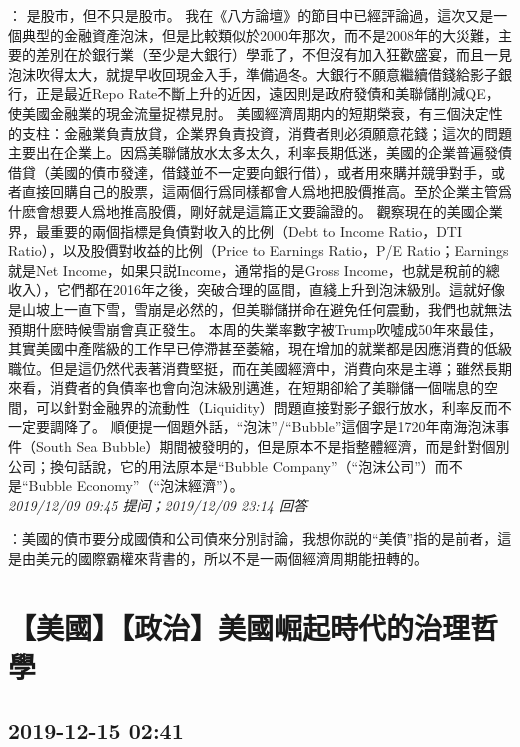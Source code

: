 \documentclass[twocolumn]{ctexart}
\begin{document}
：
是股市，但不只是股市。 
我在《八方論壇》的節目中已經評論過，這次又是一個典型的金融資產泡沫，但是比較類似於2000年那次，而不是2008年的大災難，主要的差別在於銀行業（至少是大銀行）學乖了，不但沒有加入狂歡盛宴，而且一見泡沫吹得太大，就提早收回現金入手，準備過冬。大銀行不願意繼續借錢給影子銀行，正是最近Repo Rate不斷上升的近因，遠因則是政府發債和美聯儲削減QE，使美國金融業的現金流量捉襟見肘。 
美國經濟周期内的短期榮衰，有三個決定性的支柱：金融業負責放貸，企業界負責投資，消費者則必須願意花錢；這次的問題主要出在企業上。因爲美聯儲放水太多太久，利率長期低迷，美國的企業普遍發債借貸（美國的債市發達，借錢並不一定要向銀行借），或者用來購并競爭對手，或者直接回購自己的股票，這兩個行爲同樣都會人爲地把股價推高。至於企業主管爲什麽會想要人爲地推高股價，剛好就是這篇正文要論證的。 
觀察現在的美國企業界，最重要的兩個指標是負債對收入的比例（Debt to Income Ratio，DTI Ratio），以及股價對收益的比例（Price to Earnings Ratio，P/E Ratio；Earnings就是Net Income，如果只説Income，通常指的是Gross Income，也就是稅前的總收入），它們都在2016年之後，突破合理的區間，直綫上升到泡沫級別。這就好像是山坡上一直下雪，雪崩是必然的，但美聯儲拼命在避免任何震動，我們也就無法預期什麽時候雪崩會真正發生。 
本周的失業率數字被Trump吹噓成50年來最佳，其實美國中產階級的工作早已停滯甚至萎縮，現在增加的就業都是因應消費的低級職位。但是這仍然代表著消費堅挺，而在美國經濟中，消費向來是主導；雖然長期來看，消費者的負債率也會向泡沫級別邁進，在短期卻給了美聯儲一個喘息的空間，可以針對金融界的流動性（Liquidity）問題直接對影子銀行放水，利率反而不一定要調降了。 
順便提一個題外話，“泡沫”/“Bubble”這個字是1720年南海泡沫事件（South Sea Bubble）期間被發明的，但是原本不是指整體經濟，而是針對個別公司；換句話說，它的用法原本是“Bubble Company”（“泡沫公司”）而不是“Bubble Economy”（“泡沫經濟”）。
\\

\textit{\hfill\noindent\small 2019/12/09 09:45 提问；2019/12/09 23:14 回答}

：美國的債市要分成國債和公司債來分別討論，我想你説的“美債”指的是前者，這是由美元的國際霸權來背書的，所以不是一兩個經濟周期能扭轉的。
\\


\section{【美國】【政治】美國崛起時代的治理哲學}
\subsection{2019-12-15 02:41}
\end{document}
